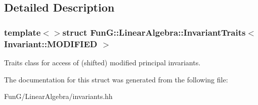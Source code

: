 \subsection{Detailed Description}
\subsubsection*{template$<$$>$struct Fun\-G\-::\-Linear\-Algebra\-::\-Invariant\-Traits$<$ Invariant\-::\-M\-O\-D\-I\-F\-I\-E\-D $>$}

Traits class for access of (shifted) modified principal invariants. 

The documentation for this struct was generated from the following file\-:\begin{DoxyCompactItemize}
\item 
Fun\-G/\-Linear\-Algebra/invariants.\-hh\end{DoxyCompactItemize}
